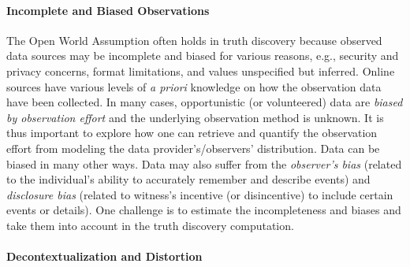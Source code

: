 \documentclass[prodmode,acmtecs]{acmsmall} %
\begin{document}
\paragraph*{Incomplete and Biased Observations}  
The Open World Assumption often holds in truth discovery
because observed data sources may be incomplete and biased for various 
reasons, e.g., security and privacy concerns, format limitations, and values 
unspecified  but inferred.
Online sources have  various levels 
of {\it a priori} knowledge on how the observation data have been collected. In many cases,
opportunistic (or volunteered) data are {\it biased by  observation effort} and the underlying
observation method is unknown. It is thus important to explore how one can retrieve and quantify
the observation effort from modeling the data provider's/observers' distribution. Data  can be biased
in many other ways. 
Data may also suffer from the {\it observer's bias} (related to the individual's ability
to accurately remember and describe events) and {\it disclosure bias} (related to witness's incentive  (or disincentive) 
to  include certain events or details). One challenge is to estimate the incompleteness and biases and take them into account
in the truth discovery computation.

\paragraph*{Decontextualization and Distortion}  
\end{document}
